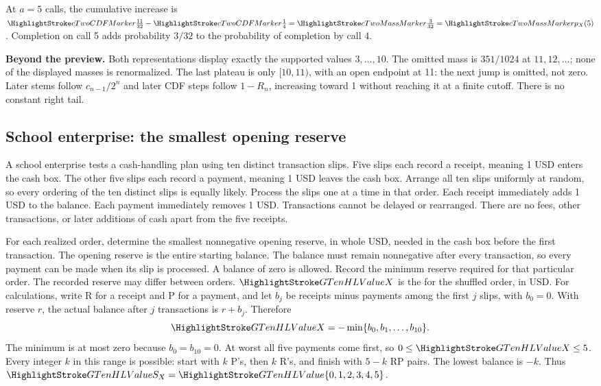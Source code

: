 \cTwoConnectionReading
\par\smallskip At $a=5$ calls, the cumulative increase is $\cTwoCDFHL{\frac{11}{32}}-\cTwoCDFHL{\frac14}=\cTwoMassHL{\frac3{32}}=\cTwoMassHL{p_X(5)}$. Completion on call 5 adds probability $3/32$ to the probability of completion by call 4.
\par\textbf{Beyond the preview.} Both representations display exactly the supported values $3,\ldots,10$. The omitted mass is $351/1024$ at $11,12,\ldots$; none of the displayed masses is renormalized. The last plateau is only $[10,11)$, with an open endpoint at 11: the next jump is omitted, not zero. Later stems follow $c_{n-1}/2^n$ and later CDF steps follow $1-R_n$, increasing toward 1 without reaching it at a finite cutoff. There is no constant right tail.
\ifGTenHighlights\else\par\vspace{3mm}\fi
{}

\clearpage
\subsection{School enterprise: the smallest opening reserve}\label{prob:reserve}
A school enterprise tests a cash-handling plan using ten distinct transaction slips. Five slips each record a receipt, meaning 1 USD enters the cash box. The other five slips each record a payment, meaning 1 USD leaves the cash box. Arrange all ten slips uniformly at random, so every ordering of the ten distinct slips is equally likely. Process the slips one at a time in that order. Each receipt immediately adds 1 USD to the balance. Each payment immediately removes 1 USD. Transactions cannot be delayed or rearranged. There are no fees, other transactions, or later additions of cash apart from the five receipts.

For each realized order, determine the smallest nonnegative opening reserve, in whole USD, needed in the cash box before the first transaction. The opening reserve is the entire starting balance. The balance must remain nonnegative after every transaction, so every payment can be made when its slip is processed. A balance of zero is allowed. Record the minimum reserve required for that particular order. The recorded reserve may differ between orders.
$\cTwoValue{X}$ is the  for the shuffled order, in USD. For calculations, write R for a receipt and P for a payment, and let $b_j$ be receipts minus payments among the first $j$ slips, with $b_0=0$. With reserve $r$, the actual balance after $j$ transactions is $r+b_j$. Therefore
\[
\cTwoValue{X}=-\min\{b_0,b_1,\ldots,b_{10}\}.
\]
The minimum is at most zero because $b_0=b_{10}=0$. At worst all five payments come first, so $0\leq \cTwoValue{X}\leq5$. Every integer $k$ in this range is possible: start with $k$ P's, then $k$ R's, and finish with $5-k$ RP pairs. The lowest balance is $-k$. Thus $\cTwoValue{S_X}=\cTwoValue{\{0,1,2,3,4,5\}}$.


